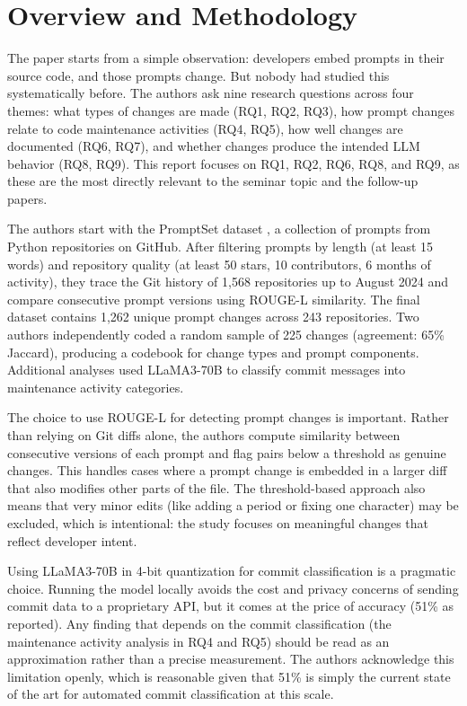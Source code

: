 \documentclass[
    pdftex,
    final,
    11pt,
    a4paper,
    parskip=false,
    oneside,
    footheight=0mm,
    footinclude=false,
    toc=bibliography
]{scrbook}
\begin{document}
\section{Overview and Methodology}

The paper starts from a simple observation: developers embed prompts in their source code, and those prompts change. But nobody had studied this systematically before. The authors ask nine research questions across four themes: what types of changes are made (RQ1, RQ2, RQ3), how prompt changes relate to code maintenance activities (RQ4, RQ5), how well changes are documented (RQ6, RQ7), and whether changes produce the intended LLM behavior (RQ8, RQ9). This report focuses on RQ1, RQ2, RQ6, RQ8, and RQ9, as these are the most directly relevant to the seminar topic and the follow-up papers.

The authors start with the PromptSet dataset \cite{Pister2024}, a collection of prompts from Python repositories on GitHub. After filtering prompts by length (at least 15 words) and repository quality (at least 50 stars, 10 contributors, 6 months of activity), they trace the Git history of 1,568 repositories up to August 2024 and compare consecutive prompt versions using ROUGE-L similarity. The final dataset contains 1,262 unique prompt changes across 243 repositories. Two authors independently coded a random sample of 225 changes (agreement: 65\% Jaccard), producing a codebook for change types and prompt components. Additional analyses used LLaMA3-70B to classify commit messages into maintenance activity categories.

The choice to use ROUGE-L for detecting prompt changes is important. Rather than relying on Git diffs alone, the authors compute similarity between consecutive versions of each prompt and flag pairs below a threshold as genuine changes. This handles cases where a prompt change is embedded in a larger diff that also modifies other parts of the file. The threshold-based approach also means that very minor edits (like adding a period or fixing one character) may be excluded, which is intentional: the study focuses on meaningful changes that reflect developer intent.

Using LLaMA3-70B in 4-bit quantization for commit classification is a pragmatic choice. Running the model locally avoids the cost and privacy concerns of sending commit data to a proprietary API, but it comes at the price of accuracy (51\% as reported). Any finding that depends on the commit classification (the maintenance activity analysis in RQ4 and RQ5) should be read as an approximation rather than a precise measurement. The authors acknowledge this limitation openly, which is reasonable given that 51\% is simply the current state of the art for automated commit classification at this scale.
\end{document}
